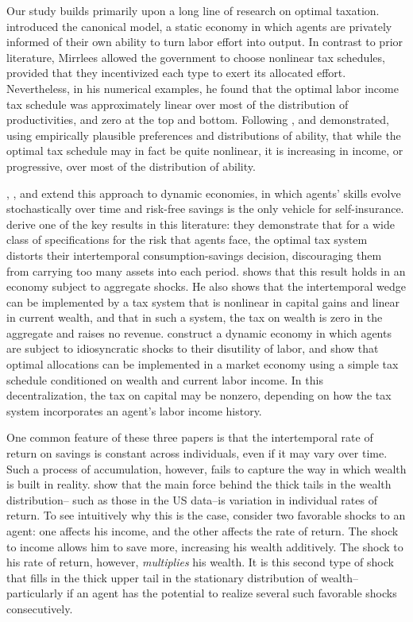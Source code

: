 \documentclass[11pt]{article}
\begin{document}
Our study builds primarily upon a long line of research on optimal taxation. \cite{mirrlees1971exploration} introduced the canonical model, a static economy in which agents are privately informed of their own ability to turn labor effort into output. In contrast to prior literature, Mirrlees allowed the government to choose nonlinear tax schedules, provided that they incentivized each type to exert its allocated effort. Nevertheless, in his numerical examples, he found that the optimal labor income tax schedule was approximately linear over most of the distribution of productivities, and zero at the top and bottom. Following \cite{mirrlees1971exploration}, \cite{diamond1998optimal} and \cite{saez2001using} demonstrated, using empirically plausible preferences and distributions of ability, that while the optimal tax schedule may in fact be quite nonlinear, it is increasing in income, or progressive, over most of the distribution of ability.

\cite{golosov2003optimal}, \cite{kocherlakota2005zero}, and \cite{albanesi2006dynamic} extend this approach to dynamic economies, in which agents' skills evolve stochastically over time and risk-free savings is the only vehicle for self-insurance. \cite{golosov2003optimal} derive one of the key results in this literature: they demonstrate that for a wide class of specifications for the risk that agents face, the optimal tax system distorts their intertemporal consumption-savings decision, discouraging them from carrying too many assets into each period. \cite{kocherlakota2005zero} shows that this result holds in an economy subject to aggregate shocks. He also shows that the intertemporal wedge can be implemented by a tax system that is nonlinear in capital gains and linear in current wealth, and that in such a system, the tax on wealth is zero in the aggregate and raises no revenue. \cite{albanesi2006dynamic} construct a dynamic economy in which agents are subject to idiosyncratic shocks to their disutility of labor, and show that optimal allocations can be implemented in a market economy using a simple tax schedule conditioned on wealth and current labor income. In this decentralization, the tax on capital may be nonzero, depending on how the tax system incorporates an agent's labor income history. 

One common feature of these three papers is that the intertemporal rate of return on savings is constant across individuals, even if it may vary over time. Such a process of accumulation, however, fails to capture the way in which wealth is built in reality. \cite{benhabib2011distribution} show that the main force behind the thick tails in the wealth distribution-- such as those in the US data--is variation in individual rates of return. To see intuitively why this is the case, consider two favorable shocks to an agent: one affects his income, and the other affects the rate of return. The shock to income allows him to save more, increasing his wealth additively. The shock to his rate of return, however, \textit{multiplies} his wealth. It is this second type of shock that fills in the thick upper tail in the stationary distribution of wealth--particularly if an agent has the potential to realize several such favorable shocks consecutively.
\end{document}
